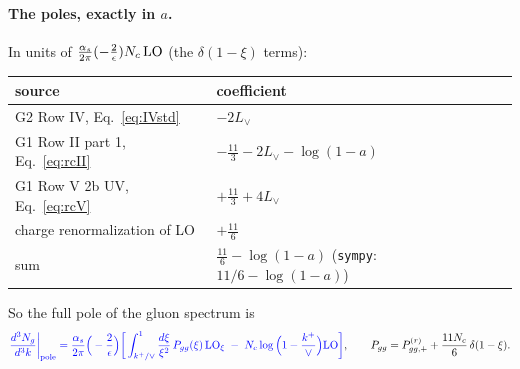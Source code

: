 \documentclass[10pt]{article}
\numberwithin{equation}{section}
\newcommand{\new}[1]{{\color{blue}#1}}
\newcommand{\Lv}{L_{\vee}}
\begin{document}
\paragraph{The poles, exactly in $a$.} In units of $\frac{\alpha_s}{2\pi}(-\frac2\epsilon)N_c\,{\rm LO}$ (the $\delta(1-\xi)$ terms):
\begin{table}[H]\centering\small
\begin{tabular}{@{}ll@{}}\toprule
source & coefficient\\\midrule
G2 Row IV, Eq.~\eqref{eq:IVstd} & $-2\Lv$\\
G1 Row II part 1, Eq.~\eqref{eq:rcII} & $-\frac{11}{3}-2\Lv-\log(1-a)$\\
G1 Row V 2b UV, Eq.~\eqref{eq:rcV} & $+\frac{11}{3}+4\Lv$\\
charge renormalization of LO & $+\frac{11}{6}$\\\midrule
sum & \new{$\frac{11}{6}-\log(1-a)$} \quad(\texttt{sympy}: $11/6 - \log(1 - a)$)\\\bottomrule
\end{tabular}
\end{table}
So the full pole of the gluon spectrum is
\begin{equation}
\new{\frac{d^3N_g}{d^3k}\bigg|_{\rm pole}=\frac{\alpha_s}{2\pi}\Big(-\frac{2}{\epsilon}\Big)\bigg[\int_{k^+/\vee}^1\frac{d\xi}{\xi^2}\,P_{gg}(\xi)\,{\rm LO}_\xi\;-\;N_c\log\Big(1-\frac{k^+}{\vee}\Big){\rm LO}\bigg]},\qquad P_{gg}=P^{(r)}_{gg,+}+\frac{11N_c}{6}\,\delta(1-\xi).
\label{eq:pole}
\end{equation}
\end{document}
